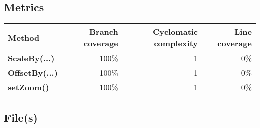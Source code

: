 \documentclass[a4paper,landscape,10pt]{article}
\begin{document}
\subsection{Metrics}
\begin{longtable}[l]{|l|r|r|r|}
\hline
\textbf{Method} & \textbf{Branch coverage} & \textbf{Cyclomatic complexity} & \textbf{Line coverage}\\
\hline
\textbf{ScaleBy(...)} & 100\% & 1 & 0\%\\
\hline
\textbf{OffsetBy(...)} & 100\% & 1 & 0\%\\
\hline
\textbf{setZoom()} & 100\% & 1 & 0\%\\
\hline
\end{longtable}
\subsection{File(s)}
\end{document}
